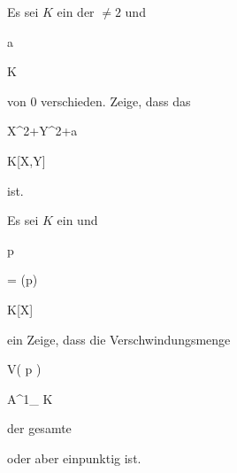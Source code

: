 {} {}




{}


{


Es sei $K$ ein
 der 
$\neq 2$ und


\mavergleichskette


{\vergleichskette


{ a
}


{ \in }{ K
}


{  }{
}


{    }{
}


{   }{
}


}
{}{}{}
von $0$ verschieden. Zeige, dass das


\mavergleichskettedisp


{\vergleichskette


{ X^2+Y^2+a
}


{ \in} { K[X,Y]
}


{ } {
}


{ } {
}


{ } {
}


}
{}{}{}
ist.


}


{} {}




{}


{


Es sei $K$ ein
und


\mavergleichskette


{\vergleichskette


{ {\mathfrak p}
}


{ = }{ (p)
}


{ \subseteq }{ K[X]
}


{    }{
}


{   }{
}


}
{}{}{}
ein
Zeige, dass die Verschwindungsmenge


\mavergleichskette


{\vergleichskette


{ V( {\mathfrak p} )
}


{ \subseteq }{ {\mathbb A}^{1}_{ K }
}


{  }{
}


{    }{
}


{   }{
}


}
{}{}{}
der gesamte


 {} {}
oder aber einpunktig
 {} {}
ist.


}


